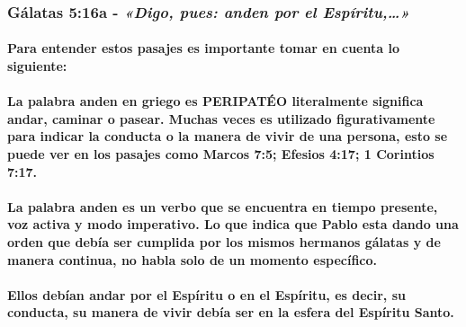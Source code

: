 \documentclass[11a pt,twoside]{article}
\newcommand{\scripture}[1]{%
  {\fontsize{12pt}{16pt}\selectfont\ScriptureFont\itshape #1}%
}
\let\oldsubsubsection\subsubsection
\renewcommand{\subsubsection}{\needspace{4\baselineskip}\oldsubsubsection}
\let\oldparagraph\paragraph
\renewcommand{\paragraph}{\needspace{3\baselineskip}\oldparagraph}
\begin{document}
\subsubsection{\texorpdfstring{Gálatas 5:16a -
\scripture{«Digo, pues: anden por el Espíritu,…»}}{Gálatas 5:16a - }}\label{guxe1latas-516a---digo-pues-anden-por-el-espuxedritu}

\paragraph{Para entender estos pasajes es importante tomar en cuenta lo
siguiente:}\label{para-entender-estos-pasajes-es-importante-tomar-en-cuenta-lo-siguiente}

\paragraph{La palabra anden en griego es PERIPATÉO literalmente
significa andar, caminar o pasear. Muchas veces es utilizado
figurativamente para indicar la conducta o la manera de vivir de una
persona, esto se puede ver en los pasajes como Marcos 7:5; Efesios 4:17;
1 Corintios
7:17.}\label{la-palabra-anden-en-griego-es-peripatuxe9o-literalmente-significa-andar-caminar-o-pasear.-muchas-veces-es-utilizado-figurativamente-para-indicar-la-conducta-o-la-manera-de-vivir-de-una-persona-esto-se-puede-ver-en-los-pasajes-como-marcos-75-efesios-417-1-corintios-717.}

\paragraph{La palabra anden es un verbo que se encuentra en tiempo
presente, voz activa y modo imperativo. Lo que indica que Pablo esta
dando una orden que debía ser cumplida por los mismos hermanos gálatas y
de manera continua, no habla solo de un momento
específico.}\label{la-palabra-anden-es-un-verbo-que-se-encuentra-en-tiempo-presente-voz-activa-y-modo-imperativo.-lo-que-indica-que-pablo-esta-dando-una-orden-que-debuxeda-ser-cumplida-por-los-mismos-hermanos-guxe1latas-y-de-manera-continua-no-habla-solo-de-un-momento-especuxedfico.}

\paragraph{Ellos debían andar por el Espíritu o en el Espíritu, es
decir, su conducta, su manera de vivir debía ser en la esfera del
Espíritu
Santo.}\label{ellos-debuxedan-andar-por-el-espuxedritu-o-en-el-espuxedritu-es-decir-su-conducta-su-manera-de-vivir-debuxeda-ser-en-la-esfera-del-espuxedritu-santo.}
\end{document}
